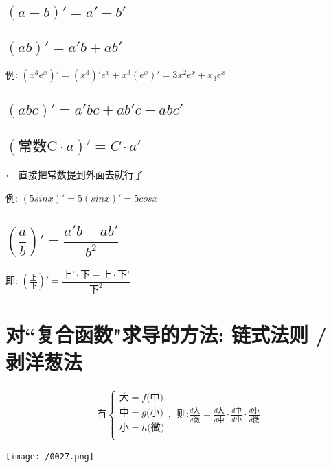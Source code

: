\documentclass[UTF8]{ctexart}
\begin{document}
\subsection{$(a-b)' = a' - b'$}

\subsection{$(ab)' = a'b + ab'$}
例: $(x^3 e^x)'=(x^3)' e^x + x^3 (e^x)' = 3x^2 e^x + x_3 e^x$


\subsection{$(abc)' = a'bc + ab'c + abc'$}


\subsection{$(\text{常数C} \cdot a)' = C \cdot a'$} ← 直接把常数提到外面去就行了

例: $(5 sinx)'=5(sinx)'=5 cosx$


\subsection{$(\dfrac{a} {b})' = \dfrac{a'b - ab'} {b^2}$}
即: $\left( \frac{\text{上}}{\text{下}} \right) '=\dfrac{\text{上'}\cdot \text{下}-\text{上}\cdot \text{下'}}{\text{下}^2}$




\section{对``复合函数"求导的方法: 链式法则 / 剥洋葱法}

\begin{align*}  %
\text{有}\left\{ \begin{array}{l}
	\text{大}=f\text{(中)}\\
	\text{中}=g\text{(小)}\\
	\text{小}=h\text{(微)}\\
\end{array},\ \ \text{则:}\frac{d\text{大}}{d\text{微}}=\frac{d\text{大}}{d\text{中}}\cdot \frac{d\text{中}}{d\text{小}}\cdot \frac{d\text{小}}{d\text{微}} \right. 
\end{align*}


\texttt{[image: /0027.png]} \\
\end{document}
